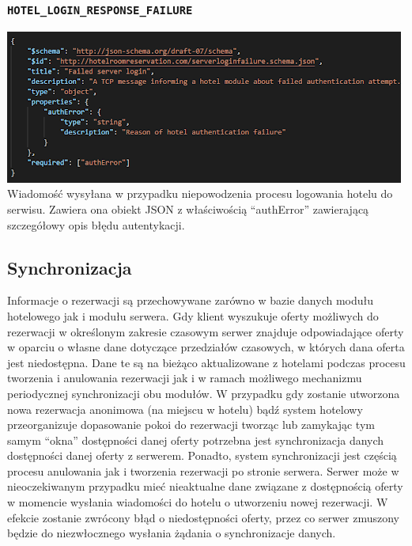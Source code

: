 \documentclass{article}
\begin{document}
\subsubsection{\texttt{HOTEL\_LOGIN\_RESPONSE\_FAILURE}}
\includegraphics[width=\linewidth]{Hotel login + synchronizacja/hotel_login_response_failure.png}
\indent Wiadomość wysyłana w przypadku niepowodzenia procesu logowania hotelu do serwisu. Zawiera ona obiekt JSON z właściwością “authError” zawierającą szczegółowy opis błędu autentykacji.

\subsection{Synchronizacja}
\indent \indent Informacje o rezerwacji są przechowywane zarówno w bazie danych modułu hotelowego jak i modułu serwera. Gdy klient wyszukuje oferty możliwych do rezerwacji w określonym zakresie czasowym serwer znajduje odpowiadające oferty w oparciu o własne dane dotyczące przedziałów czasowych, w których dana oferta jest niedostępna. Dane te są na bieżąco aktualizowane z hotelami podczas procesu tworzenia i anulowania rezerwacji jak i w ramach możliwego mechanizmu periodycznej synchronizacji obu modułów. W przypadku gdy zostanie utworzona nowa rezerwacja anonimowa (na miejscu w hotelu) bądź system hotelowy przeorganizuje dopasowanie pokoi do rezerwacji tworząc lub zamykając tym samym “okna” dostępności danej oferty potrzebna jest synchronizacja danych dostępności danej oferty z serwerem. Ponadto, system synchronizacji jest częścią procesu anulowania jak i tworzenia rezerwacji po stronie serwera. Serwer może w nieoczekiwanym przypadku mieć nieaktualne dane związane z dostępnością oferty w momencie wysłania wiadomości do hotelu o utworzeniu nowej rezerwacji. W efekcie zostanie zwrócony błąd o niedostępności oferty, przez co serwer zmuszony będzie do niezwłocznego wysłania żądania o synchronizacje danych.
\end{document}

